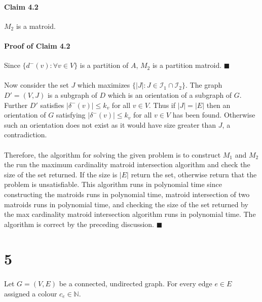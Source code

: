 \documentclass[letterpaper,12pt,oneside,onecolumn]{report}
\begin{document}
\paragraph{Claim 4.2}
$M_2$ is a matroid.
\paragraph{Proof of Claim 4.2}
Since $\{d^-(v) : \forall v \in V\}$ is a partition of $A$, $M_2$ is a partition matroid. $\blacksquare$
\paragraph{}
Now consider the set $J$ which maximizes $\{|J| : J \in \mathcal{I}_1 \cap \mathcal{I}_2 \}$. The graph $D' = (V, J)$ is a subgraph of $D$ which is an orientation of a subgraph of $G$. Further $D'$ satisfies $|\delta^-(v)| \leq k_v$ for all $v\in V$. Thus if $|J| = |E|$ then an orientation of $G$ satisfying $|\delta^-(v)| \leq k_v$ for all $v\in V$ has been found. Otherwise such an orientation does not exist as it would have size greater than $J$, a contradiction.
\paragraph{}
Therefore, the algorithm for solving the given problem is to construct $M_1$ and $M_2$ the run the maximum cardinality matroid intersection algorithm and check the size of the set returned. If the size is $|E|$ return the set, otherwise return that the problem is unsatisfiable. This algorithm runs in polynomial time since constructing the matroids runs in polynomial time, matroid intersection of two matroids runs in polynomial time, and checking the size of the set returned by the max cardinality matroid intersection algorithm runs in polynomial time. The algorithm is correct by the preceding discussion. $\blacksquare$
\section*{5}
\paragraph{}
Let $G=(V,E)$ be a connected, undirected graph. For every edge $e \in E$ assigned a colour $c_e \in \mathbb{N}$.
\end{document}
